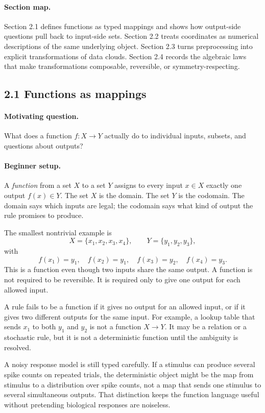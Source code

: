 \paragraph{Section map.}
Section 2.1 defines functions as typed mappings and shows how output-side questions pull back to input-side sets. Section 2.2 treats coordinates as numerical descriptions of the same underlying object. Section 2.3 turns preprocessing into explicit transformations of data clouds. Section 2.4 records the algebraic laws that make transformations composable, reversible, or symmetry-respecting.

\subsection{2.1 Functions as mappings}

\paragraph{Motivating question.}
What does a function \(f:X\to Y\) actually do to individual inputs, subsets, and questions about outputs?

\paragraph{Beginner setup.}
A \emph{function} from a set \(X\) to a set \(Y\) assigns to every input \(x\in X\) exactly one output \(f(x)\in Y\). The set \(X\) is the domain. The set \(Y\) is the codomain. The domain says which inputs are legal; the codomain says what kind of output the rule promises to produce.

The smallest nontrivial example is
\[
X=\{x_1,x_2,x_3,x_4\},\qquad
Y=\{y_1,y_2,y_3\},
\]
with
\[
f(x_1)=y_1,\quad f(x_2)=y_1,\quad f(x_3)=y_2,\quad f(x_4)=y_3.
\]
This is a function even though two inputs share the same output. A function is not required to be reversible. It is required only to give one output for each allowed input.

A rule fails to be a function if it gives no output for an allowed input, or if it gives two different outputs for the same input. For example, a lookup table that sends \(x_1\) to both \(y_1\) and \(y_2\) is not a function \(X\to Y\). It may be a relation or a stochastic rule, but it is not a deterministic function until the ambiguity is resolved.

A noisy response model is still typed carefully. If a stimulus can produce several spike counts on repeated trials, the deterministic object might be the map from stimulus to a distribution over spike counts, not a map that sends one stimulus to several simultaneous outputs. That distinction keeps the function language useful without pretending biological responses are noiseless.


